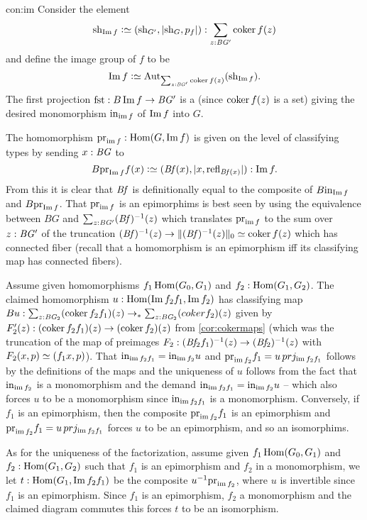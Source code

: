 \begin{implementation}{con:im}
  Consider the element
  $$\sh_{\Img f}\defequi (\sh_{G'},|\sh_G,p_f|):\sum_{z:\BG'}\coker f(z)$$ and define the image group of $f$ to be
  $$\Img f\defequi \aut_{\sum_{z:\BG'}\coker f(z)}(\sh_{\Img f}).$$
  The first projection $\fst: B\image f\to \BG'$ is a \covering
  (since $\coker f(z)$ is a set) giving the desired monomorphism $\incl_{\img f}$ of $\Img f$ into $G$.

  The homomorphism
  $\prj_{\img f}:\Hom(G,\Img f)$  is given on the level of classifying types by sending $x:\mathit{B}\mathit{G}$ to
  $$B\prj_{\Img f} f(x)\defequi (\Bf(x),|x,\refl{\Bf(x)}|):\image f.$$
  From this it is clear that $\mathit{B}\mathit{f}$ is definitionally equal to the composite of $B\incl_{\Img f}$ and $B\prj_{\Img f}$.
  That $\prj_{\img f}$ is an epimorphims is best seen by using the equivalence between $BG$ and $\sum_{z:\mathit{B}\mathit{G}'}(\mathit{B}\mathit{f})^{-1}(z)$ which translates $\prj_{\img f}$ to the sum over $z:\mathit{B}\mathit{G}'$ of the truncation $(\Bf)^{-1}(z)\to\Trunc{(\Bf)^{-1}(z)}_0\oldequiv\coker f(z)$ which has connected fiber (recall that a homomorphism is an epimorphism iff its classifying map has connected fibers).

  Assume given homomorphisms $f_1\Hom(G_0,G_1)$ and $f_2:\Hom(G_1,G_2)$.  The claimed homomorphism $u:\Hom(\Img f_2f_1,\Img f_2)$ has classifying map $Bu:\sum_{z:\BG_2}(\coker f_2f_1)(z)\to_*\sum_{z:\BG_2}(coker f_2)(z)$ given by $F_2'(z):(\coker f_2f_1)(z)\to(\coker f_2)(z)$ from \cref{cor:cokermaps} (which was the truncation of the map of preimages $F_2:(\mathit{B}\mathit{f}_2f_1)^{-1}(z)\to(\mathit{B}\mathit{f}_2)^{-1}(z)$ with $F_2(x,p)\oldequiv(f_1x,p)$).  That $\incl_{\img f_2f_1}=\incl_{\img f_2}u$ and $\prj_{\img f_2}f_1=u\,prj_{\img f_2f_1}$ follows by the definitions of the maps and the uniqueness of $u$ follows from the fact that $\incl_{\img f_2}$ is a monomorphism and the demand $\incl_{\img f_2f_1}=\incl_{\img f_2}u$ -- which also forces $u$ to be a monomorphism since $\incl_{\img f_2f_1}$ is a monomorphism.  Conversely, if $f_1$ is an epimorphism, then the composite $\prj_{\img f_2}f_1$ is an epimorphism and $\prj_{\img f_2}f_1=u\,prj_{\img f_2f_1}$ forces $u$ to be an epimorphism, and so an isomorphims.

  As for the uniqueness of the factorization, assume given $f_1\Hom(G_0,G_1)$ and $f_2:\Hom(G_1,G_2)$ such that $f_1$ is an epimorphism and $f_2$ in a monomorphism, we let $t:\Hom(G_1,\Img f_2f_1)$ be the composite $u^{-1}\prj_{\img f_2}$, where $u$ is invertible since $f_1$ is an epimorphism.  Since $f_1$ is an epimorphism, $f_2$ a monomorphism and the claimed diagram commutes this forces $t$ to be an isomorphism. %

\end{implementation}

